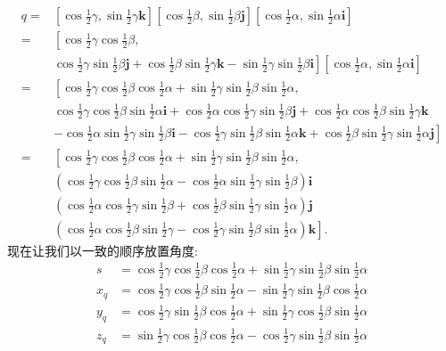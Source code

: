 $$
\begin{aligned}
q=& \left[\cos \frac{1}{2} \gamma, \sin \frac{1}{2} \gamma \mathbf{k}\right]\left[\cos \frac{1}{2} \beta, \sin \frac{1}{2} \beta \mathbf{j}\right]\left[\cos \frac{1}{2} \alpha, \sin \frac{1}{2} \alpha \mathbf{i}\right] \\
=& \left[\cos \frac{1}{2} \gamma \cos \frac{1}{2} \beta,\right. \\
& \left.\cos \frac{1}{2} \gamma \sin \frac{1}{2} \beta \mathbf{j}+\cos \frac{1}{2} \beta \sin \frac{1}{2} \gamma \mathbf{k}-\sin \frac{1}{2} \gamma \sin \frac{1}{2} \beta \mathbf{i}\right]\left[\cos \frac{1}{2} \alpha, \sin \frac{1}{2} \alpha \mathbf{i}\right] \\
=& \left[\cos \frac{1}{2} \gamma \cos \frac{1}{2} \beta \cos \frac{1}{2} \alpha+\sin \frac{1}{2} \gamma \sin \frac{1}{2} \beta \sin \frac{1}{2} \alpha\right. \text {, } \\
& \cos \frac{1}{2} \gamma \cos \frac{1}{2} \beta \sin \frac{1}{2} \alpha \mathbf{i}+\cos \frac{1}{2} \alpha \cos \frac{1}{2} \gamma \sin \frac{1}{2} \beta \mathbf{j}+\cos \frac{1}{2} \alpha \cos \frac{1}{2} \beta \sin \frac{1}{2} \gamma \mathbf{k} \\
& \left.-\cos \frac{1}{2} \alpha \sin \frac{1}{2} \gamma \sin \frac{1}{2} \beta \mathbf{i}-\cos \frac{1}{2} \gamma \sin \frac{1}{2} \beta \sin \frac{1}{2} \alpha \mathbf{k}+\cos \frac{1}{2} \beta \sin \frac{1}{2} \gamma \sin \frac{1}{2} \alpha \mathbf{j}\right] \\
=& \left[\cos \frac{1}{2} \gamma \cos \frac{1}{2} \beta \cos \frac{1}{2} \alpha+\sin \frac{1}{2} \gamma \sin \frac{1}{2} \beta \sin \frac{1}{2} \alpha\right. \text {, } \\
& \left(\cos \frac{1}{2} \gamma \cos \frac{1}{2} \beta \sin \frac{1}{2} \alpha-\cos \frac{1}{2} \alpha \sin \frac{1}{2} \gamma \sin \frac{1}{2} \beta\right) \mathbf{i} \\
& \left(\cos \frac{1}{2} \alpha \cos \frac{1}{2} \gamma \sin \frac{1}{2} \beta+\cos \frac{1}{2} \beta \sin \frac{1}{2} \gamma \sin \frac{1}{2} \alpha\right) \mathbf{j} \\
& \left.\left(\cos \frac{1}{2} \alpha \cos \frac{1}{2} \beta \sin \frac{1}{2} \gamma-\cos \frac{1}{2} \gamma \sin \frac{1}{2} \beta \sin \frac{1}{2} \alpha\right) \mathbf{k}\right] \text {. }
\end{aligned}
$$
现在让我们以一致的顺序放置角度:
$$
\begin{aligned}
s & =\cos \frac{1}{2} \gamma \cos \frac{1}{2} \beta \cos \frac{1}{2} \alpha+\sin \frac{1}{2} \gamma \sin \frac{1}{2} \beta \sin \frac{1}{2} \alpha \\
x_{q} & =\cos \frac{1}{2} \gamma \cos \frac{1}{2} \beta \sin \frac{1}{2} \alpha-\sin \frac{1}{2} \gamma \sin \frac{1}{2} \beta \cos \frac{1}{2} \alpha \\
y_{q} & =\cos \frac{1}{2} \gamma \sin \frac{1}{2} \beta \cos \frac{1}{2} \alpha+\sin \frac{1}{2} \gamma \cos \frac{1}{2} \beta \sin \frac{1}{2} \alpha \\
z_{q} & =\sin \frac{1}{2} \gamma \cos \frac{1}{2} \beta \cos \frac{1}{2} \alpha-\cos \frac{1}{2} \gamma \sin \frac{1}{2} \beta \sin \frac{1}{2} \alpha
\end{aligned}
$$
